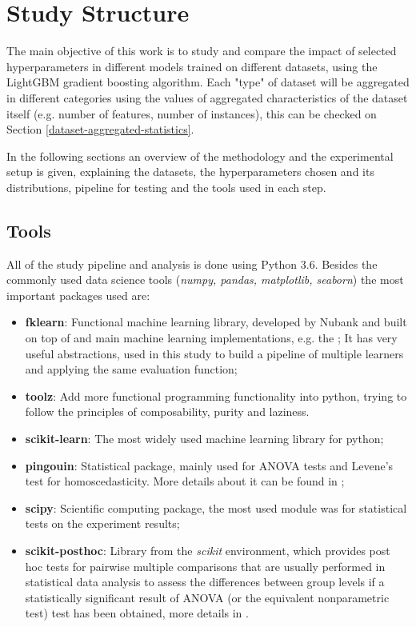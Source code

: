 \chapter{Study Structure}
\label{cap:study-methodology}

The main objective of this work is to study and compare the impact of selected hyperparameters in different models trained on different datasets, using the LightGBM gradient boosting algorithm. Each "type" of dataset will be aggregated in different categories using the values of aggregated characteristics of the dataset itself (e.g. number of features, number of instances), this can be checked on Section \ref{dataset-aggregated-statistics}.

In the following sections an overview of the methodology and the experimental setup is given, explaining the datasets, the hyperparameters chosen and its distributions, pipeline for testing and the tools used in each step.

\section{Tools}

All of the study pipeline and analysis is done using Python 3.6. Besides the commonly used data science tools (\textit{numpy, pandas, matplotlib, seaborn}) the most important packages used are:

\begin{itemize}
    \item \textbf{fklearn}: Functional machine learning library, developed by Nubank and built on top of  and main machine learning implementations, e.g. the ; It has very useful abstractions, used in this study to build a pipeline of multiple learners and applying the same evaluation function;
    \item \textbf{toolz}: Add more functional programming functionality into python, trying to follow the principles of composability, purity and laziness.
    \item \textbf{scikit-learn}: The most widely used machine learning library for python;
    \item \textbf{pingouin}: Statistical package, mainly used for ANOVA tests and Levene's test for homoscedasticity. More details about it can be found in \cite{Vallat2018};
    \item \textbf{scipy}: Scientific computing package, the most used module was  for statistical tests on the experiment results;
    \item \textbf{scikit-posthoc}: Library from the \textit{scikit} environment, which provides post hoc tests for pairwise multiple comparisons that are usually performed in statistical data analysis to assess the differences between group levels if a statistically significant result of ANOVA (or the equivalent nonparametric test) test has been obtained, more details in \cite{Terpilowski2019}.

\end{itemize}

